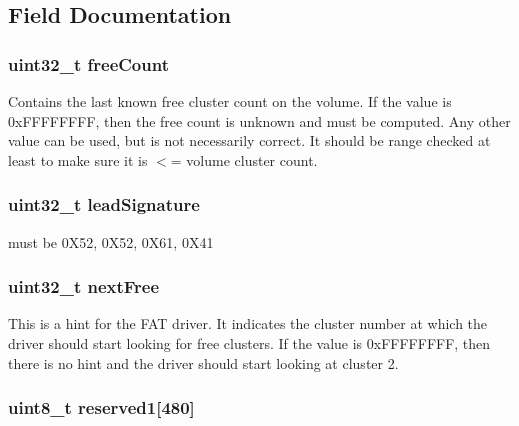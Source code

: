 \subsection{Field Documentation}
\hypertarget{structfat32__fsinfo_af5d9e0aff08147617a09dc19d207eafe}{
\subsubsection[{free\-Count}]{\setlength{\rightskip}{0pt plus 5cm}uint32\-\_\-t free\-Count}}\label{structfat32__fsinfo_af5d9e0aff08147617a09dc19d207eafe}
Contains the last known free cluster count on the volume. If the value is 0x\-F\-F\-F\-F\-F\-F\-F\-F, then the free count is unknown and must be computed. Any other value can be used, but is not necessarily correct. It should be range checked at least to make sure it is $<$= volume cluster count. \hypertarget{structfat32__fsinfo_a19196eeae2525130bdb0d39607860743}{
\subsubsection[{lead\-Signature}]{\setlength{\rightskip}{0pt plus 5cm}uint32\-\_\-t lead\-Signature}}\label{structfat32__fsinfo_a19196eeae2525130bdb0d39607860743}
must be 0\-X52, 0\-X52, 0\-X61, 0\-X41 \hypertarget{structfat32__fsinfo_a456cdbc01678df5d05eabb80f5aac9b0}{
\subsubsection[{next\-Free}]{\setlength{\rightskip}{0pt plus 5cm}uint32\-\_\-t next\-Free}}\label{structfat32__fsinfo_a456cdbc01678df5d05eabb80f5aac9b0}
This is a hint for the F\-A\-T driver. It indicates the cluster number at which the driver should start looking for free clusters. If the value is 0x\-F\-F\-F\-F\-F\-F\-F\-F, then there is no hint and the driver should start looking at cluster 2. \hypertarget{structfat32__fsinfo_aed41fe36034f1fcda738da60943924a6}{
\subsubsection[{reserved1}]{\setlength{\rightskip}{0pt plus 5cm}uint8\-\_\-t reserved1\mbox{[}480\mbox{]}}}\label{structfat32__fsinfo_aed41fe36034f1fcda738da60943924a6}
